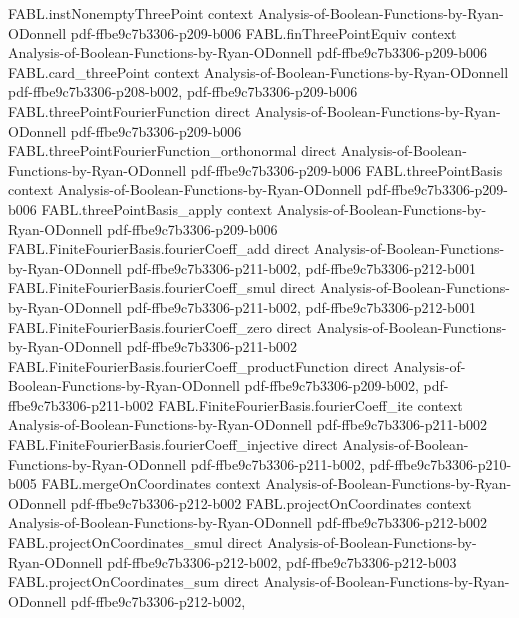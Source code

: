 \begin{theorem}
\proofstep
  {FABL.instNonemptyThreePoint}
  {context}
  {Analysis-of-Boolean-Functions-by-Ryan-ODonnell}
  {pdf-ffbe9c7b3306-p209-b006}
\proofstep
  {FABL.finThreePointEquiv}
  {context}
  {Analysis-of-Boolean-Functions-by-Ryan-ODonnell}
  {pdf-ffbe9c7b3306-p209-b006}
\proofstep
  {FABL.card_threePoint}
  {context}
  {Analysis-of-Boolean-Functions-by-Ryan-ODonnell}
  {pdf-ffbe9c7b3306-p208-b002,
    pdf-ffbe9c7b3306-p209-b006}
\proofstep
  {FABL.threePointFourierFunction}
  {direct}
  {Analysis-of-Boolean-Functions-by-Ryan-ODonnell}
  {pdf-ffbe9c7b3306-p209-b006}
\proofstep
  {FABL.threePointFourierFunction_orthonormal}
  {direct}
  {Analysis-of-Boolean-Functions-by-Ryan-ODonnell}
  {pdf-ffbe9c7b3306-p209-b006}
\proofstep
  {FABL.threePointBasis}
  {context}
  {Analysis-of-Boolean-Functions-by-Ryan-ODonnell}
  {pdf-ffbe9c7b3306-p209-b006}
\proofstep
  {FABL.threePointBasis_apply}
  {context}
  {Analysis-of-Boolean-Functions-by-Ryan-ODonnell}
  {pdf-ffbe9c7b3306-p209-b006}
\proofstep
  {FABL.FiniteFourierBasis.fourierCoeff_add}
  {direct}
  {Analysis-of-Boolean-Functions-by-Ryan-ODonnell}
  {pdf-ffbe9c7b3306-p211-b002,
    pdf-ffbe9c7b3306-p212-b001}
\proofstep
  {FABL.FiniteFourierBasis.fourierCoeff_smul}
  {direct}
  {Analysis-of-Boolean-Functions-by-Ryan-ODonnell}
  {pdf-ffbe9c7b3306-p211-b002,
    pdf-ffbe9c7b3306-p212-b001}
\proofstep
  {FABL.FiniteFourierBasis.fourierCoeff_zero}
  {direct}
  {Analysis-of-Boolean-Functions-by-Ryan-ODonnell}
  {pdf-ffbe9c7b3306-p211-b002}
\proofstep
  {FABL.FiniteFourierBasis.fourierCoeff_productFunction}
  {direct}
  {Analysis-of-Boolean-Functions-by-Ryan-ODonnell}
  {pdf-ffbe9c7b3306-p209-b002,
    pdf-ffbe9c7b3306-p211-b002}
\proofstep
  {FABL.FiniteFourierBasis.fourierCoeff_ite}
  {context}
  {Analysis-of-Boolean-Functions-by-Ryan-ODonnell}
  {pdf-ffbe9c7b3306-p211-b002}
\proofstep
  {FABL.FiniteFourierBasis.fourierCoeff_injective}
  {direct}
  {Analysis-of-Boolean-Functions-by-Ryan-ODonnell}
  {pdf-ffbe9c7b3306-p211-b002,
    pdf-ffbe9c7b3306-p210-b005}
\proofstep
  {FABL.mergeOnCoordinates}
  {context}
  {Analysis-of-Boolean-Functions-by-Ryan-ODonnell}
  {pdf-ffbe9c7b3306-p212-b002}
\proofstep
  {FABL.projectOnCoordinates}
  {context}
  {Analysis-of-Boolean-Functions-by-Ryan-ODonnell}
  {pdf-ffbe9c7b3306-p212-b002}
\proofstep
  {FABL.projectOnCoordinates_smul}
  {direct}
  {Analysis-of-Boolean-Functions-by-Ryan-ODonnell}
  {pdf-ffbe9c7b3306-p212-b002,
    pdf-ffbe9c7b3306-p212-b003}
\proofstep
  {FABL.projectOnCoordinates_sum}
  {direct}
  {Analysis-of-Boolean-Functions-by-Ryan-ODonnell}
  {pdf-ffbe9c7b3306-p212-b002,
}
\end{theorem}
